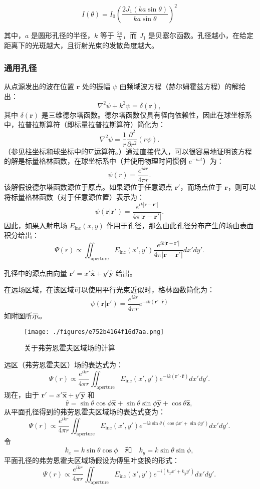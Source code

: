 \[ I(\theta) = I_0 \left( \frac{2J_1(ka \sin \theta)}{ka \sin \theta} \right)^2~\]

其中，\( a \) 是圆形孔径的半径，\( k \) 等于 \( \frac{2\pi}{\lambda} \)，而 \( J_1 \) 是贝塞尔函数。孔径越小，在给定距离下的光斑越大，且衍射光束的发散角度越大。
\subsubsection{通用孔径}  
从点源发出的波在位置 \(\mathbf{r}\) 处的振幅 \(\psi\) 由频域波方程（赫尔姆霍兹方程）的解给出：  
\[
\nabla^2 \psi + k^2 \psi = \delta (\mathbf{r}),~
\]  
其中 \(\delta (\mathbf{r})\) 是三维德尔塔函数。德尔塔函数仅具有径向依赖性，因此在球坐标系中，拉普拉斯算符（即标量拉普拉斯算符）简化为：  
\[
\nabla^2 \psi = \frac{1}{r} \frac{\partial^2}{\partial r^2} (r \psi).~
\]  
（参见柱坐标和球坐标中的\(\nabla\)运算符。）通过直接代入，可以很容易地证明该方程的解是标量格林函数，在球坐标系中（并使用物理时间惯例 \(e^{-i\omega t}\)）为：  
\[
\psi (r) = \frac{e^{ikr}}{4\pi r}.~
\]  
该解假设德尔塔函数源位于原点。如果源位于任意源点 \(\mathbf{r}'\)，而场点位于 \(\mathbf{r}\)，则可以将标量格林函数（对于任意源位置）表示为：  
\[
\psi (\mathbf{r} | \mathbf{r}') = \frac{e^{ik|\mathbf{r} - \mathbf{r}'|}}{4\pi |\mathbf{r} - \mathbf{r}'|}.~
\]  
因此，如果入射电场 \(E_{\mathrm{inc}}(x, y)\) 作用于孔径，那么由此孔径分布产生的场由表面积分给出：  
\[
\Psi (r) \propto \iint_{\mathrm{aperture}} E_{\mathrm{inc}}(x', y') \frac{e^{ik|\mathbf{r} - \mathbf{r}'|}}{4\pi |\mathbf{r} - \mathbf{r}'|} dx' dy'.~
\]

孔径中的源点由向量 \(\mathbf{r}' = x' \mathbf{\hat{x}} + y' \mathbf{\hat{y}}\) 给出。

在远场区域，在该区域可以使用平行光束近似时，格林函数简化为：
\[
\psi (\mathbf{r} |\mathbf{r}') = \frac{e^{ikr}}{4\pi r} e^{-ik(\mathbf{r}' \cdot \mathbf{\hat{r}})}~
\]
如附图所示。
\begin{figure}[ht]
\centering
\texttt{[image: ./figures/e752b4164f16d7aa.png]}
\caption{关于弗劳恩霍夫区域场的计算} \label{fig_YS_21}
\end{figure}
远区（弗劳恩霍夫区）场的表达式为：
\[
\Psi (r) \propto \frac{e^{ikr}}{4\pi r} \iint_{\text{aperture}} E_{\text{inc}}(x', y') e^{-ik(\mathbf{r}' \cdot \mathbf{\hat{r}})} dx' dy'.~
\]
现在，由于 \(\mathbf{r}' = x' \mathbf{\hat{x}} + y' \mathbf{\hat{y}}\) 和 
\[
\mathbf{\hat{r}} = \sin \theta \cos \phi \mathbf{\hat{x}} + \sin \theta \sin \phi \mathbf{\hat{y}} + \cos \theta \mathbf{\hat{z}},~
\]
从平面孔径得到的弗劳恩霍夫区域场的表达式变为：
\[
\Psi (r) \propto \frac{e^{ikr}}{4\pi r} \iint_{\text{aperture}} E_{\text{inc}}(x', y') e^{-ik \sin \theta (\cos \phi x' + \sin \phi y')} dx' dy'.~
\]
令
\[
k_{x} = k \sin \theta \cos \phi \quad \text{和} \quad k_{y} = k \sin \theta \sin \phi,~
\]
平面孔径的弗劳恩霍夫区域场假设为傅里叶变换的形式：
\[
\Psi (r) \propto \frac{e^{ikr}}{4\pi r} \iint_{\text{aperture}} E_{\text{inc}}(x', y') e^{-i(k_{x} x' + k_{y} y')} dx' dy'.~
\]

